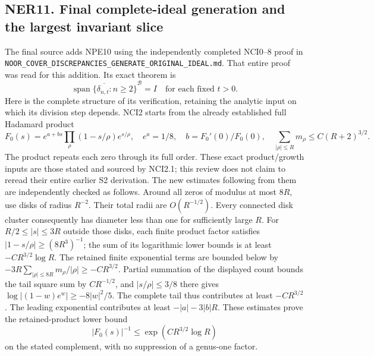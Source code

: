 \subsection{NER11. Final complete-ideal generation and the largest
invariant
slice}\label{ner11.-final-complete-ideal-generation-and-the-largest-invariant-slice}

The final source adds NPE10 using the independently completed NCI0--8
proof in
\nolinkurl{NOOR_COVER_DISCREPANCIES_GENERATE_ORIGINAL_IDEAL.md}. That
entire proof was read for this addition. Its exact theorem is \[
\overline{\operatorname{span}\{\delta_{n,t}:n\ge2\}}^{\mathcal B}=I
\quad\text{for each fixed }t>0.
\tag{NER11.1}
\] Here is the complete structure of its verification, retaining the
analytic input on which its division step depends. NCI2 starts from the
already established full Hadamard product \[
F_0(s)=e^{a+bs}\prod_\rho(1-s/\rho)e^{s/\rho},\quad
e^a=1/8,\quad b=F_0'(0)/F_0(0),\quad
\sum_{|\rho|\le R}m_\rho\le C(R+2)^{3/2}.
\tag{NER11.2}
\] The product repeats each zero through its full order. These exact
product/growth inputs are those stated and sourced by NCI2.1; this
review does not claim to reread their entire earlier S2 derivation. The
new estimates following from them are independently checked as follows.
Around all zeros of modulus at most \(8R\), use disks of radius
\(R^{-2}\). Their total radii are \(O(R^{-1/2})\). Every connected disk
cluster consequently has diameter less than one for sufficiently large
\(R\). For \(R/2\le|s|\le3R\) outside those disks, each finite product
factor satisfies \(|1-s/\rho|\ge(8R^3)^{-1}\); the sum of its
logarithmic lower bounds is at least \(-CR^{3/2}\log R\). The retained
finite exponential terms are bounded below by
\(-3R\sum_{|\rho|\le8R}m_\rho/|\rho|\ge-CR^{3/2}\). Partial summation of
the displayed count bounds the tail square sum by \(CR^{-1/2}\), and
\(|s/\rho|\le3/8\) there gives \(\log|(1-w)e^w|\ge-8|w|^2/5\). The
complete tail thus contributes at least \(-CR^{3/2}\). The leading
exponential contributes at least \(-|a|-3|b|R\). These estimates prove
the retained-product lower bound \[
|F_0(s)|^{-1}\le \exp(CR^{3/2}\log R)
\tag{NER11.3}
\] on the stated complement, with no suppression of a genus-one factor.

